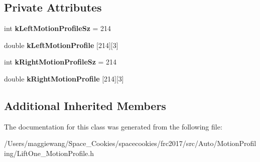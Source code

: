 \subsection*{Private Attributes}
\begin{DoxyCompactItemize}
\item 
\mbox{\label{class_lift_one___motion_profile_ad31c1278f6fcf90e77f1754e1bde2c08}} 
int {\bfseries k\+Left\+Motion\+Profile\+Sz} = 214
\item 
\mbox{\label{class_lift_one___motion_profile_a5822b92a9beeb75b3c07b0ce256f3c06}} 
double {\bfseries k\+Left\+Motion\+Profile} \mbox{[}214\mbox{]}\mbox{[}3\mbox{]}
\item 
\mbox{\label{class_lift_one___motion_profile_ad6c248f6020e78a0c47089316883a045}} 
int {\bfseries k\+Right\+Motion\+Profile\+Sz} = 214
\item 
\mbox{\label{class_lift_one___motion_profile_af47a55f1855f2bcac92b8fc0ba0c1a90}} 
double {\bfseries k\+Right\+Motion\+Profile} \mbox{[}214\mbox{]}\mbox{[}3\mbox{]}
\end{DoxyCompactItemize}
\subsection*{Additional Inherited Members}


The documentation for this class was generated from the following file\+:\begin{DoxyCompactItemize}
\item 
/\+Users/maggiewang/\+Space\+\_\+\+Cookies/spacecookies/frc2017/src/\+Auto/\+Motion\+Profiling/Lift\+One\+\_\+\+Motion\+Profile.\+h\end{DoxyCompactItemize}
